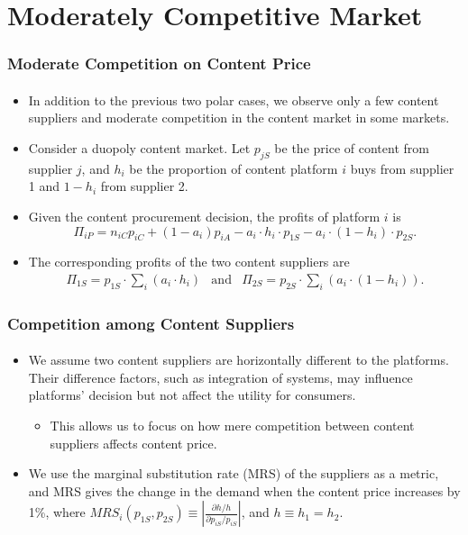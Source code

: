 \documentclass{beamer}
\newcommand{\hl}[1]{\textcolor{myblue}{#1}}
\begin{document}
\section{Moderately Competitive Market}
\begin{frame}[label=current]
    \frametitle{Moderate Competition on Content Price}
    \framesubtitle{}
    \begin{itemize}
        \item In addition to the previous two polar cases, we observe
            only a few content suppliers and moderate competition
            in the content market in some markets.
        \item Consider a duopoly content market. Let $p_{jS}$ be the price of 
            content from supplier $j$, and $h_i$ be the proportion of 
            content platform $i$ buys from supplier 1 and $1-h_i$
            from supplier 2.
        \item Given the content procurement decision, the profits of platform $i$ is
            \[
                \Pi_{iP}=n_{iC}p_{iC}+(1-a_i)p_{iA}
                -a_i\cdot h_i\cdot p_{1S}
                -a_i\cdot(1-h_i)\cdot p_{2S}.
            \]
        \item The corresponding profits of the two content suppliers are
            \[
                \begin{array}{RCL}
                    \Pi_{1S}=p_{1S}\cdot\sum_{i}(a_i\cdot h_i)
                    & \text{and} &
                    \Pi_{2S}=p_{2S}\cdot\sum_{i}\left(a_i\cdot(1-h_i)\right).
                \end{array}
            \]
    \end{itemize}
\end{frame}

\begin{frame}[label=current]
    \frametitle{Competition among Content Suppliers}
    \framesubtitle{}
    \begin{itemize}
        \item We assume two content suppliers are horizontally different to the platforms.
            Their difference factors, such as integration of systems, may influence platforms'
            decision but \hl{not affect the utility for consumers}.
            \begin{itemize}
                \item This allows us to focus on how mere competition between content
                    suppliers affects content price.
            \end{itemize}
        \item We use the marginal substitution rate (MRS) of the suppliers as a metric, and
            MRS gives the change in the demand when the content price increases by 1\%,
            where $MRS_i(p_{1S},p_{2S})\equiv\left|\frac{\partial h/h}{\partial p_{iS}/p_{iS}}\right|$,
            and $h\equiv h_1=h_2$.
    \end{itemize}
\end{frame}
\end{document}
